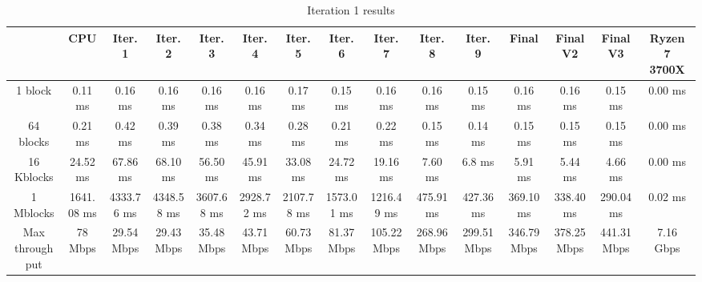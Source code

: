 \begin{table}
	\caption{Iteration 1 results}
	\centering
	\begin{tabular}{ccccccccccccccc}
		\toprule
		 & CPU & Iter. 1 & Iter. 2 & Iter. 3 & Iter. 4 & Iter. 5 & Iter. 6 & Iter. 7 & Iter. 8 & Iter. 9 & Final & Final V2 & Final V3 & Ryzen 7 3700X \\
		\midrule
		1 block & 0.11 ms & 0.16 ms & 0.16 ms & 0.16 ms & 0.16 ms & 0.17 ms & 0.15 ms & 0.16 ms & 0.16 ms & 0.15 ms & 0.16 ms & 0.16 ms & 0.15 ms & 0.00 ms \\
		64 blocks & 0.21 ms & 0.42 ms & 0.39 ms & 0.38 ms & 0.34 ms & 0.28 ms & 0.21 ms & 0.22 ms & 0.15 ms & 0.14 ms & 0.15 ms & 0.15 ms & 0.15 ms & 0.00 ms \\
		16 Kblocks & 24.52 ms & 67.86 ms & 68.10 ms & 56.50 ms & 45.91 ms & 33.08 ms & 24.72 ms & 19.16 ms & 7.60 ms & 6.8 ms & 5.91 ms & 5.44 ms & 4.66 ms & 0.00 ms \\
		1 Mblocks & 1641.08 ms & 4333.76 ms & 4348.58 ms & 3607.68 ms & 2928.72 ms & 2107.78 ms & 1573.01 ms & 1216.49 ms & 475.91 ms & 427.36 ms & 369.10 ms & 338.40 ms & 290.04 ms & 0.02 ms \\
		Max throughput & 78 Mbps & 29.54 Mbps & 29.43 Mbps & 35.48 Mbps & 43.71 Mbps & 60.73 Mbps & 81.37 Mbps & 105.22 Mbps & 268.96 Mbps & 299.51 Mbps & 346.79 Mbps & 378.25 Mbps & 441.31 Mbps & 7.16 Gbps \\
		\bottomrule
	\end{tabular}
\end{table}
